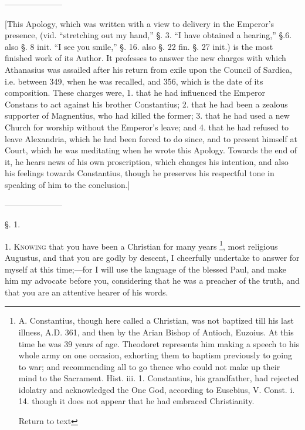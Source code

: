 
———————

[This Apology, which was written with a view to delivery in the Emperor's
presence, (vid. ``stretching out my hand,'' §. 3. ``I have obtained a
hearing,'' §.6. also §. 8 init. ``I see you smile,'' §. 16. also §.
22 fin. §. 27 init.) is the most finished work of its Author. It
professes to answer the new charges with which Athanasius was assailed
after his return from exile upon the Council of Sardica, i.e. between
349, when he was recalled, and 356, which is the date of its
composition. These charges were, 1. that he had influenced the Emperor
Constans to act against his brother Constantius; 2. that he had been a
zealous supporter of Magnentius, who had killed the former; 3. that he
had used a new Church for worship without the Emperor's leave; and 4.
that he had refused to leave Alexandria, which he had been forced to
do since, and to present himself at Court, which he was meditating
when he wrote this Apology. Towards the end of it, he hears news of
his own proscription, which changes his intention, and also his
feelings towards Constantius, though he preserves his respectful tone
in speaking of him to the conclusion.]

———————

§. 1.

1. K\textsc{nowing} that you have been a Christian for many
years \footnote{A. Constantius, though here called a Christian, was not baptized till
his last illness, A.D. 361, and then by the Arian Bishop of Antioch,
Euzoius. At this time he was 39 years of age. Theodoret represents him
making a speech to his whole army on one occasion, exhorting them to
baptism previously to going to war; and recommending all to go thence
who could not make up their mind to the Sacrament. Hist. iii. 1.
Constantius, his grandfather, had rejected idolatry and acknowledged
the One God, according to Eusebius, V. Const. i. 14. though it does
not appear that he had embraced Christianity.

Return to text}, most religious
Augustus, and that you are godly by descent, I cheerfully undertake to
answer for myself at this time;—for I will use the language of
the blessed Paul, and make him my advocate before you, considering
that he was a preacher of the truth, and that you are an attentive
hearer of his words.

